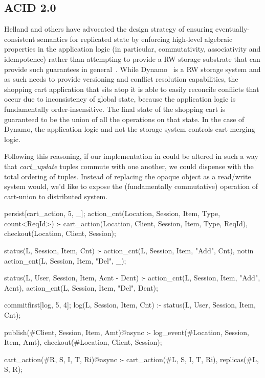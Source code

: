 \subsection{ACID 2.0}

Helland and others have advocated the design strategy of ensuring eventually-consistent 
semantics for replicated state by enforcing high-level algebraic 
properties in the application logic (in particular, commutativity, associativity and 
idempotence) rather than attempting to provide a RW storage substrate that can provide
such guarantees in general~\cite{quicksand, beyond}.  While Dynamo~\cite{dynamo} 
is a RW storage system
and as such needs to provide versioning and conflict resolution capabilities, the shopping
cart application that sits atop it is able to easily reconcile conflicts that occur due to inconsistency of global state, because the application logic is fundamentally order-insensitive.
The final state of the shopping cart is guaranteed to be the union of all the operations on
that state.  In the case of Dynamo, the application logic and not the storage system controls
cart merging logic.

Following this reasoning, if our implementation in \lang could be altered in such a way that
{\em cart\_update} tuples commute with one another,  we could dispense with the total
ordering of tuples.  Instead of replacing the opaque object as a read/write system would,
we'd like to expose the (fundamentally commutative) operation of cart-union to distributed
system.

\begin{Dedalus}
persist[cart_action, 5, _];
action_cnt(Location, Session, Item, Type, count<ReqId>) :-
    cart_action(Location, Client, Session, Item, Type, ReqId),
    checkout(Location, Client, Session);

status(L, Session, Item, Cnt) :-
    action_cnt(L, Session, Item, "Add", Cnt),
    notin action_cnt(L, Session, Item, "Del", _);

status(L, User, Session, Item, Acnt - Dcnt) :-
    action_cnt(L, Session, Item, "Add", Acnt),
    action_cnt(L, Session, Item, "Del", Dcnt);

commitfirst[log, 5, 4];
log(L, Session, Item, Cnt) :- 
    status(L, User, Session, Item, Cnt);

publish(#Client, Session, Item, Amt)@async :-
    log_event(#Location, Session, Item, Amt),
    checkout(#Location, Client, Session);

cart_action(#R, S, I, T, Ri)@async :-
    cart_action(#L, S, I, T, Ri),
    replicas(#L, S, R);
\end{Dedalus}


